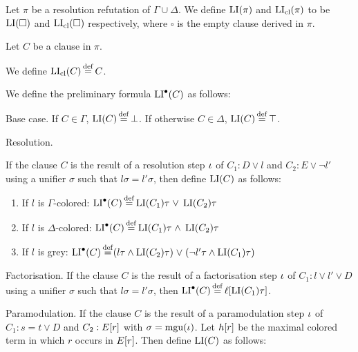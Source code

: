 \documentclass[,%
	draft=false,%
	numbers=noendperiod
	11pt,
	a4paper,
	oneside,%
	openany,
]{memoir}
\begin{document}
\begin{defi}
	Let $\pi$ be a resolution refutation of $\Gamma \cup \Delta$.
	We define $\operatorname{LI}(\pi)$ and $\operatorname{LI}_{\operatorname{cl}}(\pi)$ to be $\operatorname{LI}(\square)$ and $\operatorname{LI}_{\operatorname{cl}}(\square)$ respectively, where $\square$ is the empty clause derived in $\pi$.

	Let $C$ be a clause in $\pi$. 

	We define $\operatorname{LI}_{\operatorname{cl}}(C) \operatorname{\stackrel{\mathrm{def}}{=}} C$. 

	We define the preliminary formula $\operatorname{LI}^\bullet(C)$ as follows:

	\begin{description}
	\item{} Base case.
			If $C \in \Gamma$, $\operatorname{LI}(C) \operatorname{\stackrel{\mathrm{def}}{=}} \bot$.
			If otherwise $C \in \Delta$, $\operatorname{LI}(C) \operatorname{\stackrel{\mathrm{def}}{=}} \top$.

		\item{} Resolution.

			If the clause $C$ is the result of a resolution step $\iota$ of $C_1: D \lor l$ and $C_2: E \lor \lnot l'$ using a unifier $\sigma$ such that $l\sigma =  l'\sigma$, then define $\operatorname{LI}(C)$ as follows:

			\begin{enumerate}

				\item If $l$ is $\Gamma$-colored:
					$\operatorname{LI}^\bullet(C) \operatorname{\stackrel{\mathrm{def}}{=}} \operatorname{LI}(C_1)\tau\;{\lor}\; \operatorname{LI}(C_2)\tau $

				\item If $l$ is $\Delta$-colored:
					$\operatorname{LI}^\bullet(C) \operatorname{\stackrel{\mathrm{def}}{=}} \operatorname{LI}(C_1)\tau\;{\land}\; \operatorname{LI}(C_2)\tau$

				\item If $l$ is grey:
					$\operatorname{LI}^\bullet(C) \operatorname{\stackrel{\mathrm{def}}{=}}
					(l\tau \land \operatorname{LI}(C_2)\tau) \;{\lor}\;
					(\lnot l'\tau\land \operatorname{LI}(C_1)\tau)
					$

			\end{enumerate}

	\item{} Factorisation.
			If the clause $C$ is the result of a factorisation step $\iota$ of $C_1: l \lor l' \lor D$ using a unifier $\sigma$ such that $l\sigma = l'\sigma$, then $\operatorname{LI}^\bullet(C) \operatorname{\stackrel{\mathrm{def}}{=}} \ell[\operatorname{LI}(C_1)\tau]$.

		\item{} Paramodulation.
			If the clause $C$ is the result of a paramodulation step $\iota$ of $C_1 : s = t \lor D$ and $C_2: E[r]$ with $\sigma = \operatorname{mgu}(\iota)$.
			Let $h[r]$ be the maximal colored term in which $r$ occurs in $E[r]$.
			Then define $\operatorname{LI}(C)$ as follows:


\end{description}
\end{defi}
\end{document}
